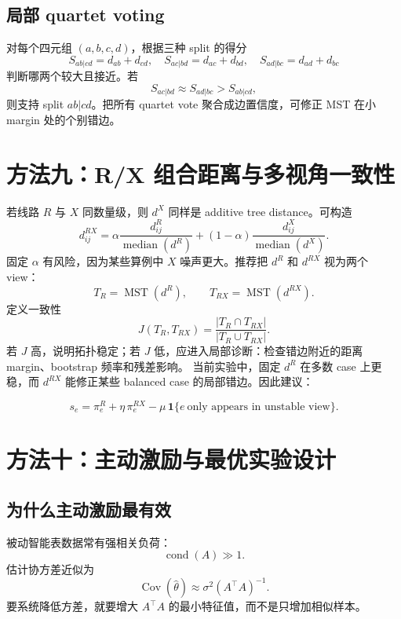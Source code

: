 \documentclass[UTF8,11pt]{ctexart}
\newcommand{\Cov}{\operatorname{Cov}}
\begin{document}
\subsection{局部 quartet voting}

对每个四元组 $(a,b,c,d)$，根据三种 split 的得分
\[
    S_{ab|cd}=d_{ab}+d_{cd},\quad
    S_{ac|bd}=d_{ac}+d_{bd},\quad
    S_{ad|bc}=d_{ad}+d_{bc}
\]
判断哪两个较大且接近。若
\[
    S_{ac|bd}\approx S_{ad|bc}>S_{ab|cd},
\]
则支持 split $ab|cd$。把所有 quartet vote 聚合成边置信度，可修正 MST 在小 margin 处的个别错边。

\section{方法九：R/X 组合距离与多视角一致性}

若线路 $R$ 与 $X$ 同数量级，则 $d^X$ 同样是 additive tree distance。可构造
\begin{equation}
    d^{RX}_{ij}
    =
    \alpha\frac{d^R_{ij}}{\operatorname{median}(d^R)}
    +(1-\alpha)\frac{d^X_{ij}}{\operatorname{median}(d^X)}.
    \label{eq:rx-distance}
\end{equation}
固定 $\alpha$ 有风险，因为某些算例中 $X$ 噪声更大。推荐把 $d^R$ 和 $d^{RX}$ 视为两个 view：
\[
    T_R=\operatorname{MST}(d^R),\qquad
    T_{RX}=\operatorname{MST}(d^{RX}).
\]
定义一致性
\[
    J(T_R,T_{RX})=\frac{|T_R\cap T_{RX}|}{|T_R\cup T_{RX}|}.
\]
若 $J$ 高，说明拓扑稳定；若 $J$ 低，应进入局部诊断：检查错边附近的距离 margin、bootstrap 频率和残差影响。
当前实验中，固定 $d^R$ 在多数 case 上更稳，而 $d^{RX}$ 能修正某些 balanced case 的局部错边。因此建议：

\begin{equation}
    s_e=\pi^R_e+\eta\,\pi^{RX}_e-\mu\,\mathbf{1}\{e\ \text{only appears in unstable view}\}.
    \label{eq:multi-view-edge-score}
\end{equation}

\section{方法十：主动激励与最优实验设计}

\subsection{为什么主动激励最有效}

被动智能表数据常有强相关负荷：
\[
    \operatorname{cond}(A)\gg1.
\]
估计协方差近似为
\[
    \Cov(\widehat\theta)\approx \sigma^2(A^\top A)^{-1}.
    \label{eq:cov-ls}
\]
要系统降低方差，就要增大 $A^\top A$ 的最小特征值，而不是只增加相似样本。
\end{document}
